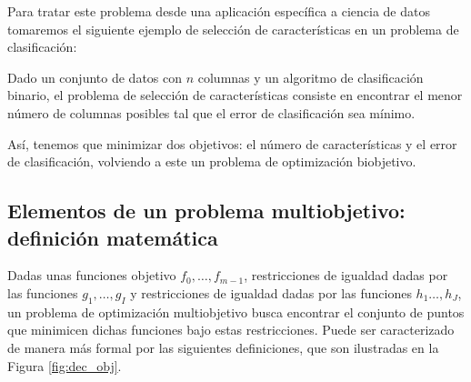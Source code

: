 Para tratar este problema desde una aplicación específica a ciencia de datos tomaremos el siguiente ejemplo de selección de características en un problema de clasificación:

\begin{texample} \label{ex:Selecc}
    Dado un conjunto de datos con $n$ columnas y un algoritmo de clasificación binario, el problema de selección de características consiste en encontrar el menor número de columnas posibles tal que el error de clasificación sea mínimo.
    
    Así, tenemos que minimizar dos objetivos: el número de características y el error de clasificación, volviendo a este un problema de optimización biobjetivo. 
\end{texample}


\subsection{Elementos de un problema multiobjetivo: definición matemática} \label{sec:Dominancia_Pareto}

Dadas unas funciones objetivo $f_0,\ldots, f_{m-1}$, restricciones de igualdad dadas por las funciones $g_1,\ldots,g_I$ y restricciones de igualdad dadas por las funciones $h_1 \ldots, h_J$, un problema de optimización multiobjetivo busca encontrar el conjunto de puntos que minimicen dichas funciones bajo estas restricciones. Puede ser caracterizado de manera más formal por las siguientes definiciones, que son ilustradas en la Figura \ref{fig:dec_obj}. 

